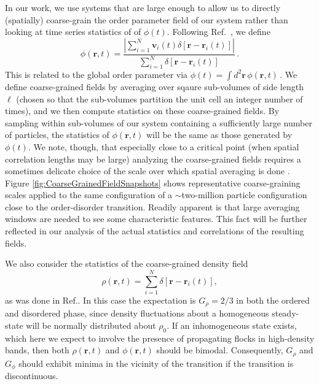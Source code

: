 \documentclass[twoside,twocolumn,9pt]{article}
\begin{document}
In our work, we use systems that are large enough to allow us to directly (spatially) coarse-grain the order parameter field of our system rather than looking at time series statistics of  of $\phi(t)$. Following Ref.~\cite{marchetti2013hydrodynamics}, we define
\begin{equation}
\label{eq::orderParamField}
\phi(\mathbf{r},t) = \frac{\left|\sum_{i=1}^{N}\mathbf{v}_{i}(t)\delta\left[\mathbf{r}-\mathbf{r}_{i}(t)\right]\right|}{\sum_{i=1}^{N}\delta\left[\mathbf{r}-\mathbf{r}_{i}(t)\right]}\,.
\end{equation}
This is related to the global order parameter via $\phi(t) = \int d^{2}\mathbf{r}\,\phi(\mathbf{r},t)\,$.
We define coarse-grained fields by averaging over sqaure sub-volumes of side length $\ell$ (chosen so that the sub-volumes partition the unit cell an integer number of times), and we then compute statistics on these coarse-grained fields.
By sampling within sub-volumes of our system containing a sufficiently large number of particles, the statistics of $\phi(\mathbf{r},t)$ will be the same as those generated by $\phi(t)$.
We note, though, that especially close to a critical point (when spatial correlation lengths may be large) analyzing the coarse-grained fields requires a sometimes delicate choice of the scale over which spatial averaging is done \cite{golden2023physically,gurevich2021learning}.
Figure \ref{fig:CoarseGrainedFieldSnapshots} shows representative coarse-graining scales applied to the same configuration of a $\sim$two-million particle configuration close to the order-disorder transition.
Readily apparent is that large averaging windows are needed to see some characteristic features. 
This fact will be further reflected in our analysis of the actual statistics and correlations of the resulting fields.


We also consider the statistics of the coarse-grained density field
\begin{equation}
\rho(\mathbf{r},t) = \sum_{i=1}^{N}\delta\left[\mathbf{r}-\mathbf{r}_{i}(t)\right],
\end{equation}
as was done in Ref.\cite{binder2021phase}.
In this case the expectation is $G_{\rho}=2/3$ in both the ordered and disordered phase, since density fluctuations about a homogeneous steady-state will be normally distributed about $\rho_{0}$.
If an inhomogeneous state exists, which here we expect to involve the presence of propagating flocks in high-density bands, then both $\rho(\mathbf{r},t)$ and $\phi(\mathbf{r},t)$ should be bimodal.
Consequently, $G_{\rho}$ and $G_{\phi}$ should exhibit minima in the vicinity of the transition \cite{chate2008collective} if the transition is discontinuous.
\end{document}
